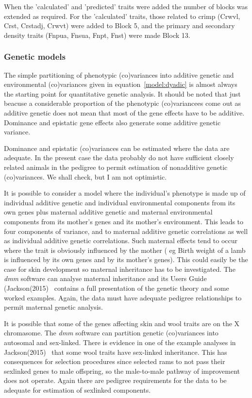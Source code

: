 \documentclass[titlepage]{article}  %
\begin{document}
When the 'calculated' and 'predicted' traits were added the number of blocks was extended as required. For the 'calculated' traits, those related to crimp (Crwvl, Crst, Crstadj, Crwvt) were added to Block 5, and the primary and secondary density traits (Fnpua, Fnsua, Fnpt, Fnst) were made Block 13.

\subsubsection{Genetic models}
The simple partitioning of phenotypic (co)variances into additive genetic and environmental (co)variances given in equation~\ref{model:dyadic} is almost always the starting point for quantitative genetic analysis. It should be noted that just beacuse a considerable proportion of the phenotypic (co)variancees come out as additive genetic does not mean that most of the gene effects have to be additive. Dominance and epistatic gene effects also generate some additive genetic variance. 

Dominance and epistatic (co)variances can be estimated where the data are adequate. In the present case the data probably do not have sufficient closely related animals in the pedigree to permit estimation of nonadditive genetic (co)variances. We shall check, but I am not optimistic.

It is possible to consider a model where the individual's phenotype is made up of individual additive genetic and individual environmental components from its own genes plus maternal additive genetic and maternal environmental components from its mother's genes and its mother's environment. This leads to four components of variance, and to maternal additive genetic correlations as well as individual additive genetic correlations. Such maternal effects tend to occur where the trait is obviously influenced by the mother ( eg Birth weight of a lamb is influenced by its own genes and by its mother's genes). This could easily be the case for skin development so maternal inheritance has to be investigated. The {\em dmm} software can analyse maternal inheritance and its Users Guide (Jackson(2015)~\cite{jack:15b} contains a full presentation of the genetic theory and some worked examples. Again, the data must have adequate pedigree relationships to permit maternal genetic analysis.

It is possible that some of the genes affecting skin and wool traits are on the X chromasome. The {\em dmm} software can partition genetic (co)variances into autosomal and sex-linked. There is evidence in one of the example analyses in Jackson(2015)~\cite{jack:15b} that some wool traits have sex-linked inheritance. This has consequences for selection procedures since selected rams to not pass their sexlinked genes to male offspring, so the male-to-male pathway of improvement does not operate. Again there are pedigree requirements for the data to be adequate for estimation of sexlinked components.
\end{document}
